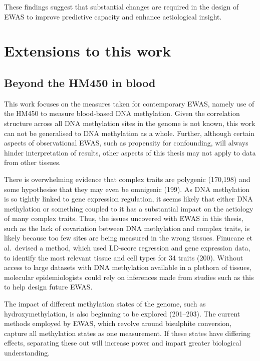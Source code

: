 \documentclass[11pt,oneside]{bristolthesis}
\begin{document}
These findings suggest that substantial changes are required in the design of EWAS to improve predictive capacity and enhance aetiological insight.

\hypertarget{extensions-to-work}{%
\section{Extensions to this work}\label{extensions-to-work}}

\hypertarget{beyond-the-hm450}{%
\subsection{Beyond the HM450 in blood}\label{beyond-the-hm450}}

This work focuses on the measures taken for contemporary EWAS, namely use of the HM450 to measure blood-based DNA methylation. Given the correlation structure across all DNA methylation sites in the genome is not known, this work can not be generalised to DNA methylation as a whole. Further, although certain aspects of observational EWAS, such as propensity for confounding, will always hinder interpretation of results, other aspects of this thesis may not apply to data from other tissues.

There is overwhelming evidence that complex traits are polygenic (170,198) and some hypothesise that they may even be omnigenic (199). As DNA methylation is so tightly linked to gene expression regulation, it seems likely that either DNA methylation or something coupled to it has a substantial impact on the aetiology of many complex traits. Thus, the issues uncovered with EWAS in this thesis, such as the lack of covariation between DNA methylation and complex traits, is likely because too few sites are being measured in the wrong tissues. Finucane et al.~devised a method, which used LD-score regression and gene expression data, to identify the most relevant tissue and cell types for 34 traits (200). Without access to large datasets with DNA methylation available in a plethora of tissues, molecular epidemiologists could rely on inferences made from studies such as this to help design future EWAS.

The impact of different methylation states of the genome, such as hydroxymethylation, is also beginning to be explored (201--203). The current methods employed by EWAS, which revolve around bisulphite conversion, capture all methylation states as one measurement. If these states have differing effects, separating these out will increase power and impart greater biological understanding.
\end{document}
